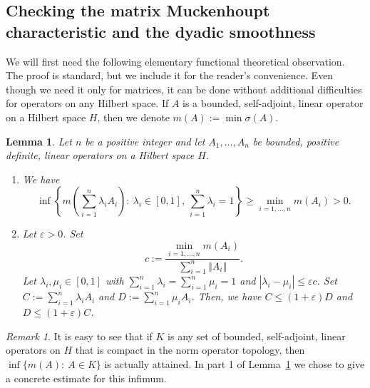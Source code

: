 \documentclass{amsart}
\newcommand{\e}{\varepsilon}
\newtheorem{lem}[thm]{Lemma}
\theoremstyle{definition}
\theoremstyle{remark}
\newtheorem{rem}[thm]{Remark}
\begin{document}
\subsection{Checking the matrix Muckenhoupt characteristic and the dyadic smoothness}
\label{subs:small_step_dyadic_smoothness}

We will first need the following elementary functional theoretical observation. The proof is standard, but we include it for the reader's convenience. Even though we need it only for matrices, it can be done without additional difficulties for operators on any Hilbert space. If $A$ is a bounded, self-adjoint, linear operator on a Hilbert space $H$, then we denote $m(A):=\min\sigma(A)$.

\begin{lem}
    \label{lem:near_convex_comparable}
    Let $n$ be a positive integer and let $A_1,\ldots,A_n$ be bounded, positive definite, linear operators on a Hilbert space $H$.
    \begin{enumerate}
        \item We have
        \begin{equation*}
            \inf\left\{m\left(\sum_{i=1}^{n}\lambda_iA_i\right):~\lambda_i\in[0,1],~\sum_{i=1}^{n}\lambda_i=1\right\}\geq\min_{i=1,\ldots,n}m(A_i)>0.
        \end{equation*}

        \item Let $\e>0$. Set
        \begin{equation*}
            c:=\frac{\min_{i=1,\ldots,n}m(A_i)}{\sum_{i=1}^{n}\Vert A_i\Vert}.
        \end{equation*}
        Let $\lambda_i,\mu_i\in[0,1]$ with $\sum_{i=1}^{n}\lambda_i=\sum_{i=1}^{n}\mu_i=1$ and $|\lambda_i-\mu_i|\leq\e c$. Set $C:=\sum_{i=1}^{n}\lambda_iA_i$ and $D:=\sum_{i=1}^{n}\mu_iA_i$. Then, we have $C\leq(1+\e)D$ and $D\leq(1+\e)C$.
    \end{enumerate}
\end{lem}

\begin{rem}
    It is easy to see that if $K$ is any set of bounded, self-adjoint, linear operators on $H$ that is compact in the norm operator topology, then $\inf\{m(A):~A\in K\}$ is actually attained. In part 1 of Lemma~\ref{lem:near_convex_comparable} we chose to give a concrete estimate for this infimum.
\end{rem}
\end{document}
